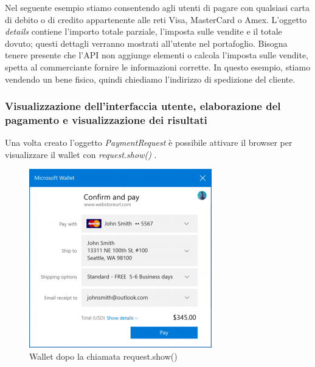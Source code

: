 \documentclass[11pt ,a4paper , twoside , openright ]{book}
\begin{document}
	Nel seguente esempio stiamo consentendo agli utenti di pagare con qualsiasi carta di debito o di credito appartenente alle reti Visa, MasterCard o Amex. L'oggetto \textit{details} contiene l'importo totale parziale, l'imposta sulle vendite e il totale dovuto; questi dettagli verranno mostrati all'utente nel portafoglio. Bisogna tenere presente che l'API non aggiunge elementi o calcola l'imposta sulle vendite, spetta al commerciante fornire le informazioni corrette. In questo esempio, stiamo vendendo un bene fisico, quindi chiediamo l'indirizzo di spedizione del cliente.
	
	\subsubsection{Visualizzazione dell'interfaccia utente, elaborazione del pagamento e visualizzazione dei risultati}
	Una volta creato l'oggetto \textit{PaymentRequest} è possibile attivare il browser per visualizzare il wallet con \textit{request.show()} \cite{rif2}. 
	\begin{figure}[h]
		\centering
		\includegraphics[width=0.5\linewidth]{wallet1}
		\caption{Wallet dopo la chiamata request.show()}
		\label{fig: Wallet dopo la chiamata request.show()}
	\end{figure}
	\\
	
\end{document}
